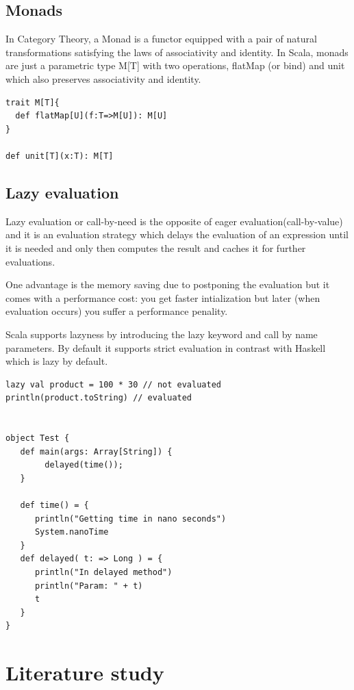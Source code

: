 \documentclass{article}
\begin{document}
\subsection {Monads}  \label{monads}
In Category Theory, a Monad is a functor equipped with a pair of natural transformations satisfying the laws of associativity and identity. In Scala, monads are just a parametric type M[T] with two operations, flatMap (or bind) and unit which also preserves associativity and identity. \par

\begin{lstlisting}
trait M[T]{
  def flatMap[U](f:T=>M[U]): M[U]
}

def unit[T](x:T): M[T]
\end{lstlisting}

\subsection {Lazy evaluation}
Lazy evaluation or call-by-need is the opposite of eager evaluation(call-by-value) and it is an evaluation strategy which delays the evaluation of an expression until it is needed and only then computes the result and caches it for further evaluations. \par
One advantage is the memory saving due to postponing the evaluation but it comes with a performance cost: you get faster intialization but later (when evaluation occurs) you suffer a performance penality.\par

Scala supports lazyness by introducing the lazy keyword and call by name parameters. By default it supports strict evaluation in contrast with Haskell which is lazy by default.

\begin{lstlisting}
lazy val product = 100 * 30 // not evaluated
println(product.toString) // evaluated 


object Test {
   def main(args: Array[String]) {
        delayed(time());
   }

   def time() = {
      println("Getting time in nano seconds")
      System.nanoTime
   }
   def delayed( t: => Long ) = {
      println("In delayed method")
      println("Param: " + t)
      t
   }
}

\end{lstlisting}

\section {Literature study}
\end{document}
